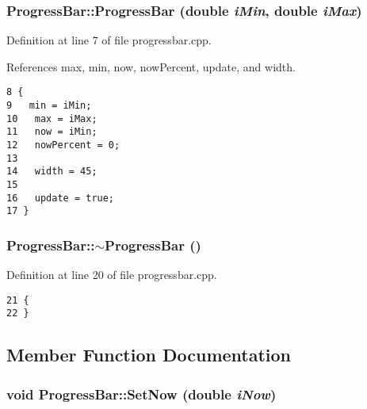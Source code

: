 \subsubsection{\setlength{\rightskip}{0pt plus 5cm}ProgressBar::ProgressBar (double {\em iMin}, double {\em iMax})}\label{classProgressBar_816453dc9f180edc84d7c51b73a14546}




Definition at line 7 of file progressbar.cpp.

References max, min, now, nowPercent, update, and width.

\begin{Code}\begin{verbatim}8 {
9   min = iMin;
10   max = iMax;
11   now = iMin;
12   nowPercent = 0;
13   
14   width = 45;
15   
16   update = true;
17 }
\end{verbatim}
\end{Code}


\subsubsection{\setlength{\rightskip}{0pt plus 5cm}ProgressBar::$\sim$ProgressBar ()}\label{classProgressBar_a0ced60c0ade467a4602c35443e7bc78}




Definition at line 20 of file progressbar.cpp.

\begin{Code}\begin{verbatim}21 {
22 }
\end{verbatim}
\end{Code}




\subsection{Member Function Documentation}
\subsubsection{\setlength{\rightskip}{0pt plus 5cm}void ProgressBar::SetNow (double {\em iNow})}\label{classProgressBar_b04618141efbac296b3403ea532fd94e}





